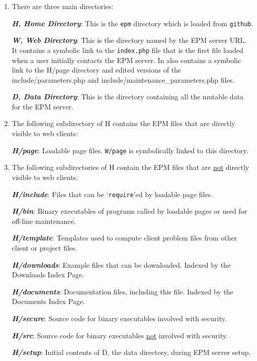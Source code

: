 \documentclass[12pt]{article}
\newcommand{\key}[1]{{\bf \em #1}}
\newcommand{\EOL}{\penalty \exhyphenpenalty}
\begin{document}
\begin{enumerate}
\item There are three main directories:\label{MAIN-DIRECTORIES}

      \key{H, Home Directory}:\label{H-DIRECTORY}  This is the {\tt epm}
      directory which is loaded from {\tt github}.

      \key{W, Web Directory}\label{W-DIRECTORY}:  This is the directory
      named by the EPM server URL.  It contains a symbolic link to
      the {\tt index.php} file that is
      the first file loaded when a user initially
      contacts the EPM server.  In also contains a symbolic link to
      the H/page directory and edited versions of the
      include/parameters.php and include/maintenance\_\EOL parameters.php
      files.

      \key{D, Data Directory}:  This is the directory
      containing all the mutable data for the EPM server.

\item The following subdirectory of H contains the
      EPM files that are directly visible to web clients:

      \key{H/page}:  Loadable page files.  {\tt W/page} is
      symbolically linked to this directory.

\item The following subdirectories of H contain the
      EPM files that are \underline{not}
      directly visible to web clients:

      \key{H/include}:  Files that can be `{\tt require}'ed by
      loadable page files.

      \key{H/bin}:  Binary executables of programs called by
      loadable pages or used for off-line maintenance.

      \key{H/template}:  Templates used to compute client problem
      files from other client or project files.

      \key{H/downloads}:  Example files that can be downloaded.
      			  Indexed by the Downloads Index Page.

      \key{H/documents}:  Documentation files, including this file.
      			  Indexed by the Documents Index Page.

      \key{H/secure}:  Source code for binary executables involved with
      security.

      \key{H/src}:  Source code for binary executables \underline{not}
      involved with security.

      \key{H/setup}:  Initial contents of D, the data directory,
      during EPM server setup.

\end{enumerate}
\end{document}
